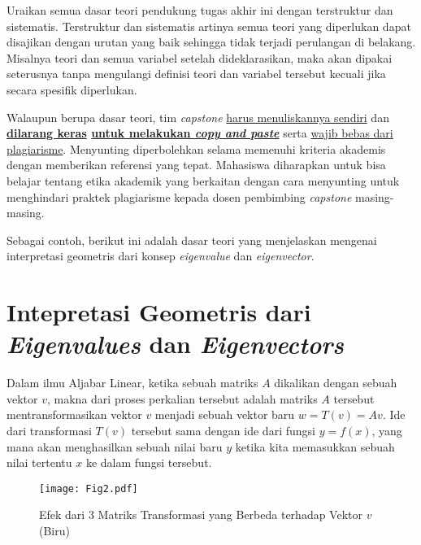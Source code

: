 Uraikan semua dasar teori pendukung tugas akhir ini dengan terstruktur dan sistematis. Terstruktur dan sistematis artinya semua teori yang diperlukan dapat disajikan dengan urutan yang baik sehingga tidak terjadi perulangan di belakang. Misalnya teori dan semua variabel setelah dideklarasikan, maka akan dipakai seterusnya tanpa mengulangi definisi teori dan variabel tersebut kecuali jika secara spesifik diperlukan. 

Walaupun berupa dasar teori, tim \textit{capstone} \uline{harus menuliskannya sendiri} dan \textbf{\uline{dilarang keras} \uline{untuk melakukan \textit{copy and paste}}} serta \uline{wajib bebas dari plagiarisme}. Menyunting diperbolehkan selama memenuhi kriteria akademis dengan memberikan referensi yang tepat. Mahasiswa diharapkan untuk bisa belajar tentang etika akademik yang berkaitan dengan cara menyunting untuk menghindari praktek plagiarisme kepada dosen pembimbing \textit{capstone} masing-masing.

Sebagai contoh, berikut ini adalah dasar teori yang menjelaskan mengenai interpretasi geometris dari konsep \textit{eigenvalue} dan \textit{eigenvector}.

\section{Intepretasi Geometris dari \textit{Eigenvalues} dan \textit{Eigenvectors}}
\label{sec:Interpretasi_Geometris_Eigenvalue_Eigenvector}

    Dalam ilmu Aljabar Linear, ketika sebuah matriks $A$ dikalikan dengan sebuah vektor $v$, makna dari proses perkalian tersebut adalah matriks $A$ tersebut mentransformasikan vektor $v$ menjadi sebuah vektor baru $w = T(v) = Av$. Ide dari transformasi $T(v)$ tersebut sama dengan ide dari fungsi $y = f(x)$, yang mana akan menghasilkan sebuah nilai baru $y$ ketika kita memasukkan sebuah nilai tertentu $x$ ke dalam fungsi tersebut. 
    
    \begin{figure}[h!]
        \centering
        \texttt{[image: Fig2.pdf]}
        \caption{Efek dari 3 Matriks Transformasi yang Berbeda terhadap Vektor $v$ (Biru)}
        \label{fig:Ch02_Vector_Transformation}
    \end{figure}
        
